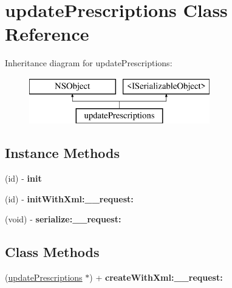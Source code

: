 \hypertarget{interfaceupdate_prescriptions}{}\section{update\+Prescriptions Class Reference}
\label{interfaceupdate_prescriptions}
Inheritance diagram for update\+Prescriptions\+:\begin{figure}[H]
\begin{center}
\leavevmode
\includegraphics[height=2.000000cm]{interfaceupdate_prescriptions}
\end{center}
\end{figure}
\subsection*{Instance Methods}
\begin{DoxyCompactItemize}
\item 
\hypertarget{interfaceupdate_prescriptions_aa319c6077ceab122d7d7f89e57030584}{}(id) -\/ {\bfseries init}\label{interfaceupdate_prescriptions_aa319c6077ceab122d7d7f89e57030584}

\item 
\hypertarget{interfaceupdate_prescriptions_a2bc798cd3da2bd9ff9ba3ed943e9dffb}{}(id) -\/ {\bfseries init\+With\+Xml\+:\+\_\+\+\_\+request\+:}\label{interfaceupdate_prescriptions_a2bc798cd3da2bd9ff9ba3ed943e9dffb}

\item 
\hypertarget{interfaceupdate_prescriptions_abf32d698b0d96cd00dee4d28207a94c9}{}(void) -\/ {\bfseries serialize\+:\+\_\+\+\_\+request\+:}\label{interfaceupdate_prescriptions_abf32d698b0d96cd00dee4d28207a94c9}

\end{DoxyCompactItemize}
\subsection*{Class Methods}
\begin{DoxyCompactItemize}
\item 
\hypertarget{interfaceupdate_prescriptions_ac755c550944b151976c3c207e8230085}{}(\hyperlink{interfaceupdate_prescriptions}{update\+Prescriptions} $\ast$) + {\bfseries create\+With\+Xml\+:\+\_\+\+\_\+request\+:}\label{interfaceupdate_prescriptions_ac755c550944b151976c3c207e8230085}

\end{DoxyCompactItemize}

